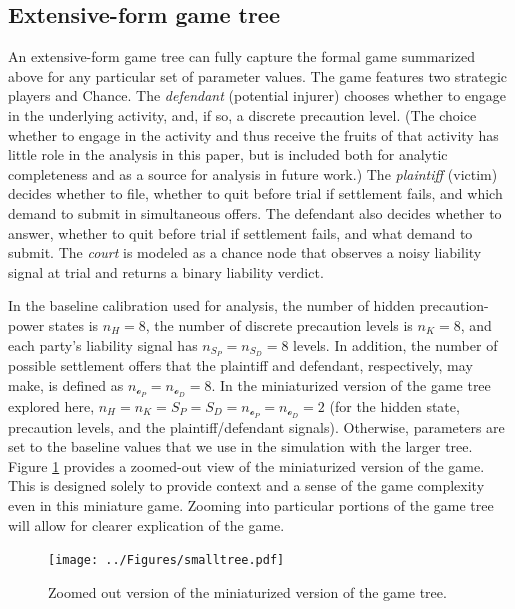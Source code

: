 \documentclass{article}
\begin{document}
\subsection{Extensive-form game tree}

An extensive-form game tree can fully capture the formal game summarized above for any particular set of parameter values. The game features two strategic players and Chance. The \emph{defendant} (potential injurer) chooses whether to engage in the underlying activity, and, if so, a discrete precaution level. (The choice whether to engage in the activity and thus receive the fruits of that activity has little role in the analysis in this paper, but is included both for analytic completeness and as a source for analysis in future work.) The \emph{plaintiff} (victim) decides whether to file, whether to quit before trial if settlement fails, and which demand to submit in simultaneous offers. The defendant also decides whether to answer, whether to quit before trial if settlement fails, and what demand to submit. The \emph{court} is modeled as a chance node that observes a noisy liability signal at trial and returns a binary liability verdict.

In the baseline calibration used for analysis, the number of hidden precaution-power states is $n_H=8$, the number of discrete precaution levels is $n_K=8$, and each party’s liability signal has $n_{S_P}=n_{S_D}=8$ levels. In addition, the number of possible settlement offers that the plaintiff and defendant, respectively, may make, is defined as $n_{\mathcal{o}_P} = n_{\mathcal{o}_D} = 8$. In the miniaturized version of the game tree explored here, $n_H = n_K = S_P = S_D = n_{\mathcal{o}_P} = n_{\mathcal{o}_D} = 2$ (for the hidden state, precaution levels, and the plaintiff/defendant signals). Otherwise, parameters are set to the baseline values that we use in the simulation with the larger tree. Figure \ref{fig:smalltree.pdf} provides a zoomed-out view of the miniaturized version of the game. This is designed solely to provide context and a sense of the game complexity even in this miniature game. Zooming into particular portions of the game tree will allow for clearer explication of the game.

 \begin{figure}[t]
  \centering
  \texttt{[image: ../Figures/smalltree.pdf]}
  \caption{Zoomed out version of the miniaturized version of the game tree.}
  \label{fig:smalltree.pdf}
\end{figure}
\end{document}
